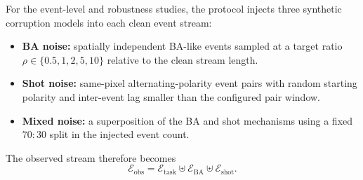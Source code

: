 \documentclass[a4paper,fleqn]{cas-dc}
\begin{document}
\begin{table}[t]
\centering
\caption{Datasets and evaluation roles. N-Caltech101 events are resized with aspect-ratio-preserving scaling and zero-centered padding to $128\times 128$ before filtering and slicing so that all methods on that dataset share the same spatial support.}
\label{tab:datasets_exp}
\end{table}

For the event-level and robustness studies, the protocol injects three synthetic corruption models into each clean event stream:
\begin{itemize}
    \item \textbf{BA noise:} spatially independent BA-like events sampled at a target ratio $\rho \in \{0.5,1,2,5,10\}$ relative to the clean stream length.
    \item \textbf{Shot noise:} same-pixel alternating-polarity event pairs with random starting polarity and inter-event lag smaller than the configured pair window.
    \item \textbf{Mixed noise:} a superposition of the BA and shot mechanisms using a fixed $70{:}30$ split in the injected event count.
\end{itemize}
The observed stream therefore becomes
\begin{equation}
\mathcal{E}_{\text{obs}} = \mathcal{E}_{\text{task}} \uplus \mathcal{E}_{\text{BA}} \uplus \mathcal{E}_{\text{shot}}.
\label{eq:observed_stream}
\end{equation}
\end{document}
